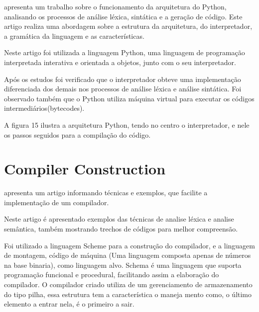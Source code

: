 \documentclass[12pt,oneside,a4paper,chapter=TITLE,section=TITLE,sumario=tradicional]{abntex2}
\begin{document}
\cite{eduardo2010} apresenta um trabalho sobre o funcionamento da arquitetura do Python, analisando os processos de análise léxica, sintática e a geração de código. Este artigo realiza uma abordagem sobre a estrutura da arquitetura, do interpretador, a gramática da linguagem e as características.

Neste artigo foi utilizada a linguagem Python, uma linguagem de programação interpretada interativa e orientada a objetos, junto com o seu interpretador.

Após os estudos foi verificado que o interpretador obteve uma implementação diferenciada dos demais nos processos de análise léxica e análise sintática. Foi observado também que o Python utiliza máquina virtual para executar os códigos intermediários(bytecodes).

A figura 15 ilustra a arquitetura Python, tendo no centro o interpretador, e nele os passos seguidos para a compilação do código.

\begin{figure}[htb]
\end{figure}

\section{ Compiler Construction}
\label{sec:compiler-construction}

\cite{aastha2013} apresenta um artigo informando técnicas e exemplos, que facilite a implementação de um compilador. 

Neste artigo é apresentado exemplos das técnicas de analise léxica e analise semântica, também mostrando trechos de códigos para melhor compreensão.

Foi utilizado a linguagem Scheme para a construção do compilador, e a linguagem de montagem, código de máquina (Uma linguagem composta apenas de números na base binaria), como linguagem alvo. Schema é uma linguagem que suporta programação funcional e procedural, facilitando assim a elaboração do compilador. O compilador criado utiliza de um gerenciamento de armazenamento do tipo pilha, essa estrutura tem a característica o maneja mento como, o último elemento a entrar nela, é o primeiro a sair.
\end{document}
